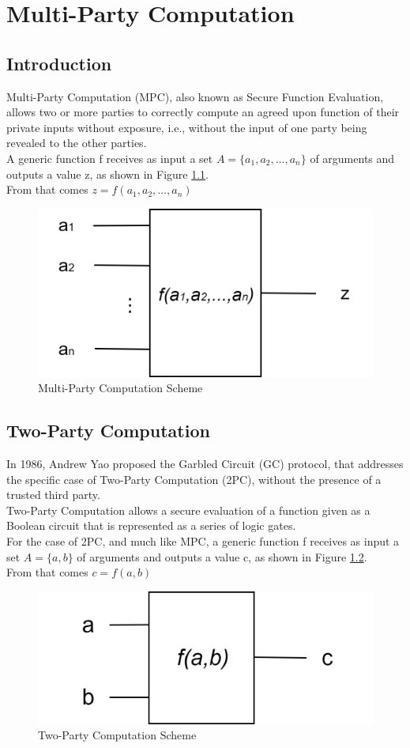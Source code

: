 \chapter{Multi-Party Computation}

\section{Introduction}
Multi-Party Computation (MPC), also known as Secure Function Evaluation, allows two or more parties
to correctly compute an agreed upon function of their private inputs without exposure, i.e., without
the input of one party being revealed to the other parties.\\
A generic function f receives as input a set $A = \{a_1,a_2,\dots,a_n\}$
of arguments and outputs a value z, as shown in Figure \ref{fig:mpcscheme}.\\
From that comes $z = f(a_1,a_2,\dots,a_n)$

\renewcommand{\figurename}{Figure}
\begin{figure}[H]
\centering
\includegraphics[width=.45\linewidth]{./figures/mpc_scheme}
\caption{Multi-Party Computation Scheme}
\label{fig:mpcscheme}
\end{figure}

\section{Two-Party Computation}
In 1986, Andrew Yao proposed the Garbled Circuit (GC) protocol, that addresses the specific case
of Two-Party Computation (2PC), without the presence of a trusted third party.\\
Two-Party Computation allows a secure evaluation of a function given
as a Boolean circuit that is represented as a series of logic gates.\\
For the case of 2PC, and much like MPC, a generic function f receives as input a set $A = \{a,b\}$
of arguments and outputs a value c, as shown in Figure \ref{fig:tpcscheme}.\\
From that comes $c = f(a,b)$

\renewcommand{\figurename}{Figure}
\begin{figure}[H]
\centering
\includegraphics[width=.35\linewidth]{./figures/two_party_computation_scheme}
\caption{Two-Party Computation Scheme}
\label{fig:tpcscheme}
\end{figure}


